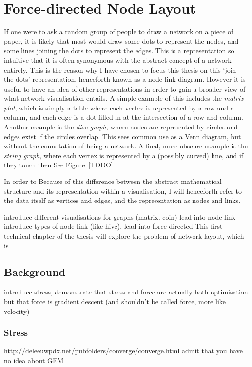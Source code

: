 \chapter{Force-directed Node Layout}
If one were to ask a random group of people to draw a network on a piece of paper, it is likely that most would draw some dots to represent the nodes, and some lines joining the dots to represent the edges. This is a representation so intuitive that it is often synonymous with the abstract concept of a network entirely.
This is the reason why I have chosen to focus this thesis on this `join-the-dots' representation, henceforth known as a node-link diagram.
However it is useful to have an idea of other representations in order to gain a broader view of what network visualisation entails. A simple example of this includes the \emph{matrix plot}, which is simply a table where each vertex is represented by a row and a column, and each edge is a dot filled in at the intersection of a row and column.
Another example is the \emph{disc graph}, where nodes are represented by circles and edges exist if the circles overlap. This sees common use as a Venn diagram, but without the connotation of being a network.
A final, more obscure example is the \emph{string graph}, where each vertex is represented by a (possibly curved) line, and if they touch then 
See Figure~\ref{TODO}

In order to Because of this difference between the abstract mathematical structure and its representation within a visualisation, I will henceforth refer to the data itself as vertices and edges, and the representation as nodes and links.

introduce different visualisations for graphs (matrix, coin) lead into node-link
introduce types of node-link (like hive), lead into force-directed
This first technical chapter of the thesis will explore the problem of network layout, which is 

\section{Background}
introduce stress, demonstrate that stress and force are actually both optimisation but that force is gradient descent (and shouldn't be called force, more like velocity)
\subsection{Stress}
\url{http://deleeuwpdx.net/pubfolders/converge/converge.html}
admit that you have no idea about GEM 

